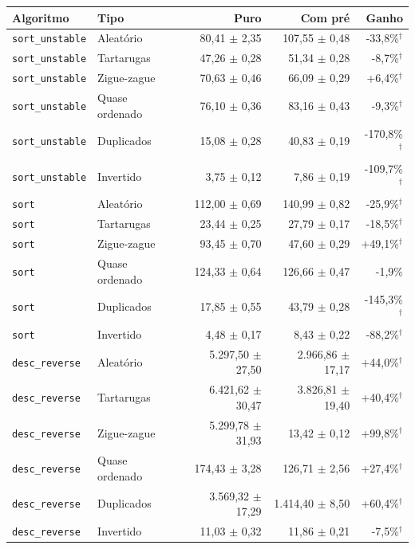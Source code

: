 \footnotesize
\begin{tabular}{llrrr}
\hline
\textbf{Algoritmo} & \textbf{Tipo} & \textbf{Puro} & \textbf{Com pré} & \textbf{Ganho} \\
\hline
\texttt{sort\_unstable} & Aleatório & 80,41 $\pm$ 2,35 & 107,55 $\pm$ 0,48 & -33,8\%$^{\dagger}$ \\
\texttt{sort\_unstable} & Tartarugas & 47,26 $\pm$ 0,28 & 51,34 $\pm$ 0,28 & -8,7\%$^{\dagger}$ \\
\texttt{sort\_unstable} & Zigue-zague & 70,63 $\pm$ 0,46 & 66,09 $\pm$ 0,29 & +6,4\%$^{\dagger}$ \\
\texttt{sort\_unstable} & Quase ordenado & 76,10 $\pm$ 0,36 & 83,16 $\pm$ 0,43 & -9,3\%$^{\dagger}$ \\
\texttt{sort\_unstable} & Duplicados & 15,08 $\pm$ 0,28 & 40,83 $\pm$ 0,19 & -170,8\%$^{\dagger}$ \\
\texttt{sort\_unstable} & Invertido & 3,75 $\pm$ 0,12 & 7,86 $\pm$ 0,19 & -109,7\%$^{\dagger}$ \\
\texttt{sort} & Aleatório & 112,00 $\pm$ 0,69 & 140,99 $\pm$ 0,82 & -25,9\%$^{\dagger}$ \\
\texttt{sort} & Tartarugas & 23,44 $\pm$ 0,25 & 27,79 $\pm$ 0,17 & -18,5\%$^{\dagger}$ \\
\texttt{sort} & Zigue-zague & 93,45 $\pm$ 0,70 & 47,60 $\pm$ 0,29 & +49,1\%$^{\dagger}$ \\
\texttt{sort} & Quase ordenado & 124,33 $\pm$ 0,64 & 126,66 $\pm$ 0,47 & -1,9\% \\
\texttt{sort} & Duplicados & 17,85 $\pm$ 0,55 & 43,79 $\pm$ 0,28 & -145,3\%$^{\dagger}$ \\
\texttt{sort} & Invertido & 4,48 $\pm$ 0,17 & 8,43 $\pm$ 0,22 & -88,2\%$^{\dagger}$ \\
\texttt{desc\_reverse} & Aleatório & 5.297,50 $\pm$ 27,50 & 2.966,86 $\pm$ 17,17 & +44,0\%$^{\dagger}$ \\
\texttt{desc\_reverse} & Tartarugas & 6.421,62 $\pm$ 30,47 & 3.826,81 $\pm$ 19,40 & +40,4\%$^{\dagger}$ \\
\texttt{desc\_reverse} & Zigue-zague & 5.299,78 $\pm$ 31,93 & 13,42 $\pm$ 0,12 & +99,8\%$^{\dagger}$ \\
\texttt{desc\_reverse} & Quase ordenado & 174,43 $\pm$ 3,28 & 126,71 $\pm$ 2,56 & +27,4\%$^{\dagger}$ \\
\texttt{desc\_reverse} & Duplicados & 3.569,32 $\pm$ 17,29 & 1.414,40 $\pm$ 8,50 & +60,4\%$^{\dagger}$ \\
\texttt{desc\_reverse} & Invertido & 11,03 $\pm$ 0,32 & 11,86 $\pm$ 0,21 & -7,5\%$^{\dagger}$ \\
\hline
\end{tabular}
